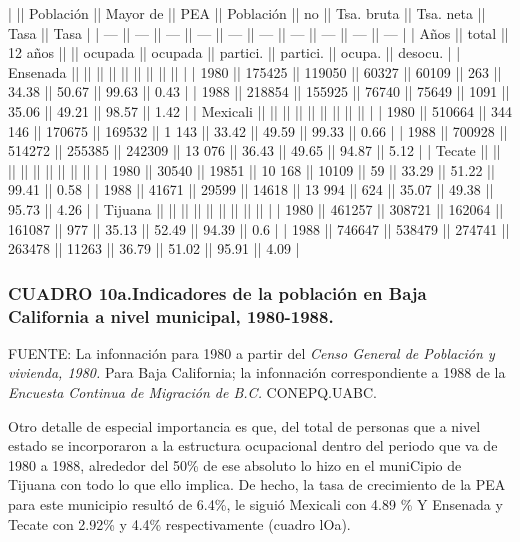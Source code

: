 \documentclass{article}
\begin{document}
|          || Población || Mayor de || PEA    || Población || no      || Tsa. bruta || Tsa. neta || Tasa   || Tasa    |
| ---      || ---       || ---      || ---    || ---       || ---     || ---        || ---       || ---    || ---     |
| Años     || total     || 12 años  ||        || ocupada   || ocupada || partici.   || partici.  || ocupa. || desocu. |
| Ensenada ||           ||          ||        ||           ||         ||            ||           ||        ||         |
| 1980     || 175425    || 119050   || 60327  || 60109     || 263     || 34.38      || 50.67     || 99.63  || 0.43    |
| 1988     || 218854    || 155925   || 76740  || 75649     || 1091    || 35.06      || 49.21     || 98.57  || 1.42    |
| Mexicali ||           ||          ||        ||           ||         ||            ||           ||        ||         |
| 1980     || 510664    || 344 146  || 170675 || 169532    || 1 143   || 33.42      || 49.59     || 99.33  || 0.66    |
| 1988     || 700928    || 514272   || 255385 || 242309    || 13 076  || 36.43      || 49.65     || 94.87  || 5.12    |
| Tecate   ||           ||          ||        ||           ||         ||            ||           ||        ||         |
| 1980     || 30540     || 19851    || 10 168 || 10109     || 59      || 33.29      || 51.22     || 99.41  || 0.58    |
| 1988     || 41671     || 29599    || 14618  || 13 994    || 624     || 35.07      || 49.38     || 95.73  || 4.26    |
| Tijuana  ||           ||          ||        ||           ||         ||            ||           ||        ||         |
| 1980     || 461257    || 308721   || 162064 || 161087    || 977     || 35.13      || 52.49     || 94.39  || 0.6     |
| 1988     || 746647    || 538479   || 274741 || 263478    || 11263   || 36.79      || 51.02     || 95.91  || 4.09    |

\subsubsection{CUADRO 10a.Indicadores de la población en Baja California a nivel municipal, 1980-1988.}

FUENTE: La infonnación para 1980 a partir del \textit{Censo General de Población y vivienda, 1980.} Para Baja California; la infonnación correspondiente a 1988 de la \textit{Encuesta Continua de Migración de B.C.} CONEPQ.UABC.

Otro detalle de especial importancia es que, del total de personas que a nivel estado se incorporaron a la estructura ocupacional dentro del periodo que va de 1980 a 1988, alrededor del 50\% de ese absoluto lo hizo en el muniCipio de Tijuana con todo lo que ello implica. De hecho, la tasa de crecimiento de la PEA para este municipio resultó de 6.4\%, le siguió Mexicali con 4.89 \% Y Ensenada y Tecate con 2.92\% y 4.4\% respectivamente (cuadro lOa).
\end{document}
